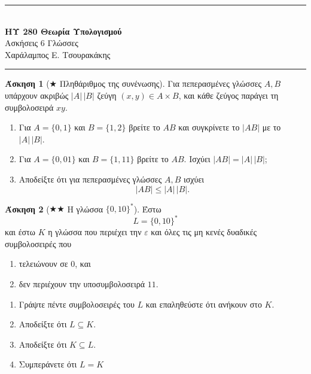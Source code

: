 \documentclass[11pt,a4paper]{article}
\newcommand{\horrule}[1]{\rule{\linewidth}{#1}}
\newcommand{\eps}{\varepsilon}
\theoremstyle{definition}
\newtheorem{question}{Άσκηση}
\begin{document}
\begin{center}
\horrule{0.4pt}\\[0.15cm]
{\large\textbf{ΗΥ 280 \textemdash{} Θεωρία Υπολογισμού}}\\[0.1cm]
{Ασκήσεις 6 \textemdash{} Γλώσσες}\\[0.1cm]
{Χαράλαμπος Ε. Τσουρακάκης}\\
\horrule{0.4pt}
\end{center}

\begin{center}\end{center}\medskip

\begin{question}[$\bigstar$ Πληθάριθμος της συνένωσης]
Για πεπερασμένες γλώσσες $A,B$ υπάρχουν ακριβώς $|A|\,|B|$ ζεύγη
$(x,y)\in A\times B$, και κάθε ζεύγος παράγει τη συμβολοσειρά $xy$.

\begin{enumerate}
\item Για $A=\{0,1\}$ και $B=\{1,2\}$ βρείτε το $AB$ και συγκρίνετε το
$|AB|$ με το $|A|\,|B|$.

\item Για $A=\{0,01\}$ και $B=\{1,11\}$ βρείτε το $AB$.
Ισχύει $|AB|=|A|\,|B|$;

\item Αποδείξτε ότι για πεπερασμένες γλώσσες $A,B$ ισχύει
\[
|AB|\leq |A|\,|B|.
\]
\end{enumerate}
\end{question}
 

\begin{question}[$\bigstar\bigstar$ Η γλώσσα $\{0,10\}^*$]
Έστω
\[
L=\{0,10\}^*
\]
και έστω $K$ η γλώσσα που περιέχει την $\eps$ και όλες τις μη κενές
δυαδικές συμβολοσειρές που

\begin{enumerate}
\item τελειώνουν σε $0$, και
\item δεν περιέχουν την υποσυμβολοσειρά $11$.
\end{enumerate}

\begin{enumerate}
\item Γράψτε πέντε συμβολοσειρές του $L$ και επαληθεύστε ότι ανήκουν στο
$K$.

\item Αποδείξτε ότι $L\subseteq K.$

\item Αποδείξτε ότι $K\subseteq L.$


\item Συμπεράνετε ότι $L=K$
\end{enumerate}
\end{question}
 
\end{document}
